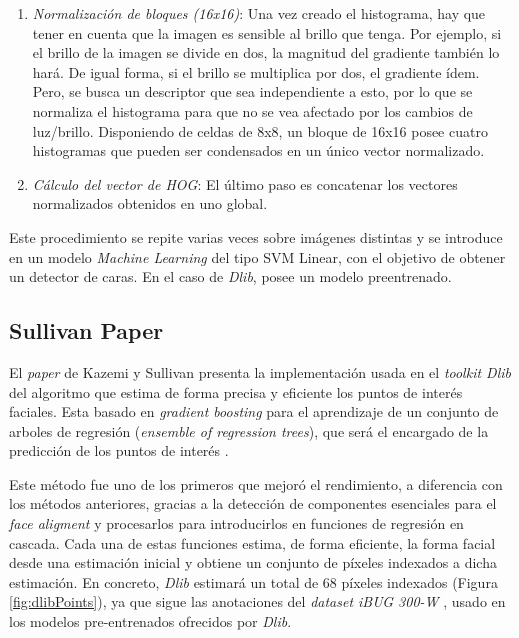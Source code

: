\begin{enumerate}
	\item \textit{Normalización de bloques (16x16)}: Una vez creado el histograma, hay que tener en cuenta que la imagen es sensible al brillo que tenga. Por ejemplo, si el brillo de la imagen se divide en dos, la magnitud del gradiente también lo hará. De igual forma, si el brillo se multiplica por dos, el gradiente ídem. Pero, se busca un descriptor que sea independiente a esto, por lo que se normaliza el histograma para que no se vea afectado por los cambios de luz/brillo.	Disponiendo de celdas de 8x8, un bloque de 16x16 posee cuatro histogramas que pueden ser condensados en un único vector normalizado.
	
	\item \textit{Cálculo del vector de HOG}: El último paso es concatenar los vectores normalizados obtenidos en uno global.

\end{enumerate}

Este procedimiento se repite varias veces sobre imágenes distintas y se introduce en un modelo \textit{Machine Learning} del tipo SVM Linear, con el objetivo de obtener un detector de caras. En el caso de \textit{Dlib}, posee un modelo preentrenado.


\subsection*{Sullivan Paper}

El \textit{paper} de Kazemi y Sullivan presenta la implementación usada en el \textit{toolkit Dlib} del algoritmo que estima de forma precisa y eficiente los puntos de interés faciales. Esta basado en \textit{gradient boosting} para el aprendizaje de un conjunto de arboles de regresión (\textit{ensemble of regression trees}), que será el encargado de la predicción de los puntos de interés \cite{faceLandmark}.

Este método fue uno de los primeros que mejoró el rendimiento, a diferencia con los métodos anteriores, gracias a la detección de componentes esenciales para el \textit{face aligment} y procesarlos para introducirlos en funciones de regresión en cascada. Cada una de estas funciones estima, de forma eficiente, la forma facial desde una estimación inicial y obtiene un conjunto de píxeles indexados a dicha estimación. En concreto, \textit{Dlib} estimará un total de 68 píxeles indexados (Figura \ref{fig:dlibPoints}), ya que sigue las anotaciones del \textit{dataset iBUG 300-W} \cite{ibug}, usado en los modelos pre-entrenados ofrecidos por \textit{Dlib}.

